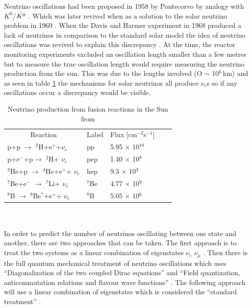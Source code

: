 Neutrino oscillations had been proposed in 1958 by Pontecorvo by analogy with $K^0$/$\Bar{K^0}$  \cite{griffiths2008book} \cite{griffiths2008neutrinoOscillations} \cite{pontecorvo1958_OscillationProposal}. Which was later revived when as a solution to the solar neutrino problem in 1969 \cite{pontecorvo_gibov_1969_solar_oscillation}. When the Davis and Harmer experiment in 1968 produced a lack of neutrinos in comparison to the standard solar model the idea of neutrino oscillations was revived to explain this discrepancy \cite{pontecorvo_gibov_1969_solar_oscillation}. At the time, the reactor monitoring experiments excluded an oscillation length smaller than a few metres but to measure the true oscillation length would require measuring the neutrino production from the sun. This was due to the lengths involved (O $\sim$ 10$^6$\,km) \cite{pontecorvo_gibov_1969_solar_oscillation} and as seen in table \ref{solar_nuetrino_table} the mechanisms for solar neutrinos all produce $\nu_e$s so if any oscillations occur a discrepancy would be visible. 
\begin{table}
\centering
\begin{tabular}{lllll}  
\toprule
\multicolumn{1}{c}{Reaction} & \multicolumn{1}{c}{Label} & \multicolumn{1}{c}{Flux [cm$^{-2}$s$^{-1}$]}
\\
\cmidrule(r){1-1}
\cmidrule(r){2-2}
\cmidrule(r){3-3}
p+p $\rightarrow$ $^2$H+e$^+$+$\nu_e$           & pp                & 5.95 $\times$ 10$^{10}$\\
p+e$^-$+p$\rightarrow$ $^2$H+ $\nu_e$           & pep               & 1.40 $\times$ 10$^{8}$\\
$^3$He+p $\rightarrow$ $^4$He+e$^+$+ $\nu_e$     & hep               & 9.3  $\times$ 10$^{3}$\\
$^7$Be+e$^-$ $\rightarrow$ $^7$Li+ $\nu_e$       & $^7$Be            & 4.77 $\times$ 10$^{9}$\\
$^8$B $\rightarrow$ $^8$Be$^*$+e$^+$+ $\nu_e$   & $^8$B             & 5.05 $\times$ 10$^{6}$\\
\bottomrule   
\end{tabular}
\caption{Neutrino production from fusion reactions in the Sun from \cite{Bellerive:2003rj} }
\label{solar_nuetrino_table}
\end{table}
\\\\In order to predict the number of neutrinos oscillating between one state and another, there are two approaches that can be taken. The first approach is to treat the two systems as a linear combination of eigenstates $\nu_e$ $\nu_\mu$ \cite{griffiths2008book}\cite{griffiths2008neutrinoOscillations} \cite{sassaroli1999neutrino}. Then there is the full quantum mechanical treatment of neutrino oscillations which uses ``Diagonalization of the two coupled Dirac equations'' and ``Field quantization, anticommutation relations and flavour wave functions'' \cite{sassaroli1999neutrino}. The following approach will use a linear combination of eigenstates which is considered the ``standard treatment'' \cite{sassaroli1999neutrino} \cite{griffiths2008book} \cite{griffiths2008neutrinoOscillations}.
